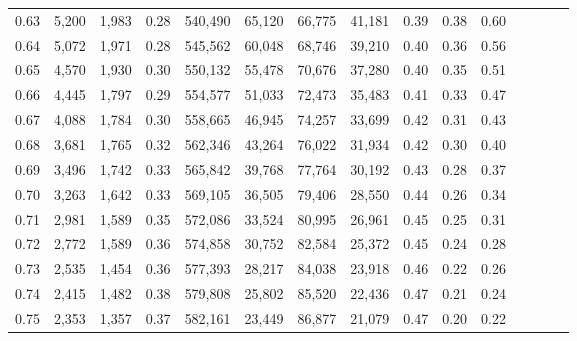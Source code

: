 \begin{tabular}{rrrcrrrrrrrrrrr}
0.63 &   5,200 &  1,983 &                                       0.28 &  540,490 &   65,120 &   66,775 &   41,181 &  0.39 &  0.38 &                         0.60 \\
0.64 &   5,072 &  1,971 &                                       0.28 &  545,562 &   60,048 &   68,746 &   39,210 &  0.40 &  0.36 &                         0.56 \\
0.65 &   4,570 &  1,930 &                                       0.30 &  550,132 &   55,478 &   70,676 &   37,280 &  0.40 &  0.35 &                         0.51 \\
0.66 &   4,445 &  1,797 &                                       0.29 &  554,577 &   51,033 &   72,473 &   35,483 &  0.41 &  0.33 &                         0.47 \\
0.67 &   4,088 &  1,784 &                                       0.30 &  558,665 &   46,945 &   74,257 &   33,699 &  0.42 &  0.31 &                         0.43 \\
0.68 &   3,681 &  1,765 &                                       0.32 &  562,346 &   43,264 &   76,022 &   31,934 &  0.42 &  0.30 &                         0.40 \\
0.69 &   3,496 &  1,742 &                                       0.33 &  565,842 &   39,768 &   77,764 &   30,192 &  0.43 &  0.28 &                         0.37 \\
0.70 &   3,263 &  1,642 &                                       0.33 &  569,105 &   36,505 &   79,406 &   28,550 &  0.44 &  0.26 &                         0.34 \\
0.71 &   2,981 &  1,589 &                                       0.35 &  572,086 &   33,524 &   80,995 &   26,961 &  0.45 &  0.25 &                         0.31 \\
0.72 &   2,772 &  1,589 &                                       0.36 &  574,858 &   30,752 &   82,584 &   25,372 &  0.45 &  0.24 &                         0.28 \\
0.73 &   2,535 &  1,454 &                                       0.36 &  577,393 &   28,217 &   84,038 &   23,918 &  0.46 &  0.22 &                         0.26 \\
0.74 &   2,415 &  1,482 &                                       0.38 &  579,808 &   25,802 &   85,520 &   22,436 &  0.47 &  0.21 &                         0.24 \\
0.75 &   2,353 &  1,357 &                                       0.37 &  582,161 &   23,449 &   86,877 &   21,079 &  0.47 &  0.20 &                         0.22 \\

\end{tabular}

